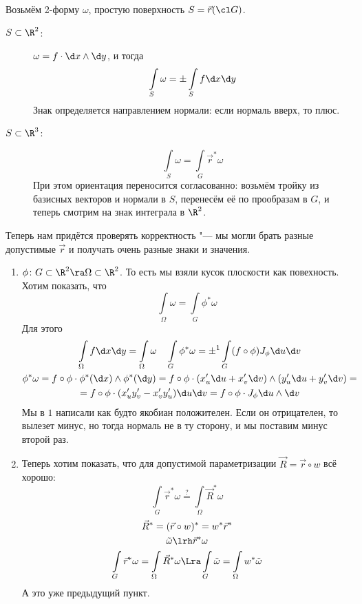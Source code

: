 \begin{Def}
	Возьмём 2-форму $\omega$, простую поверхность $S = \vec r(\cl G)$.
	\begin{description}
	\item[$S \subset \R^2$:]
		$\omega = f \cdot \d x \wedge \d y$, и тогда
		\[ \int\limits_S \omega = \pm\int\limits_S f \d x \d y \]
		Знак определяется направлением нормали: если нормаль вверх, то плюс.

	\item[$S \subset \R^3$:]
		\[ \int\limits_S \omega = \int\limits_G \vec r^* \omega \]
		При этом ориентация переносится согласованно:
		возьмём тройку из базисных векторов и нормали в $S$, перенесём её по прообразам в $G$, и теперь смотрим на знак интеграла в $\R^2$.
	\end{description}
\end{Def}

\begin{Rem}
	Теперь нам придётся проверять корректность "--- мы могли брать разные допустимые $\vec r$ и получать очень разные знаки и значения.
\end{Rem}

\begin{theorem}
	\begin{enumerate}
	\item
		$\phi\colon G \subset \R^2 \ra \Omega \subset \R^2$.
		То есть мы взяли кусок плоскости как повехность.
		Хотим показать, что
		\[ \int\limits_\Omega \omega = \int\limits_G \phi^* \omega\]
		Для этого
		\begin{gather*}
			\int\limits_\Omega f \d x \d y = \int\limits_\Omega \omega \quad
			\int\limits_G \phi^* \omega = \pm^1 \int\limits_G (f \circ \phi) J_\phi \d u \d v \\
			\phi^* \omega
			= f \circ \phi \cdot \phi^*(\d x) \wedge \phi^*(\d y)
			= f \circ \phi \cdot (x_u' \d u + x_v' \d v) \wedge (y_u' \d u + y_v' \d v) = \\
			= f \circ \phi \cdot (x_u' y_v' - x_v' y_u') \d u \d v
			= f \circ \phi \cdot J_\phi \d u \wedge \d v
		\end{gather*}
		Мы в $1$ написали как будто якобиан положителен.
		Если он отрицателен, то вылезет минус, но тогда нормаль не в ту сторону, и мы поставим минус второй раз.

	\item
		Теперь хотим показать, что для допустимой параметризации $\vec R = \vec r \circ w$ всё хорошо:
		\[ \int\limits_G \vec r^* \omega \stackrel{?}{=} \int\limits_\Omega \vec R^* \omega \]
		\begin{gather*}
			\vec R^* = (\vec r \circ w)^* = w^* \vec r^* \\
			\tilde \omega \lrh \vec r^* \omega \\
			\int\limits_G \vec r^* \omega = \int\limits_\Omega \vec R^* \omega \Lra
			\int\limits_G \tilde \omega = \int\limits_\Omega w^* \tilde \omega
		\end{gather*}
		А это уже предыдущий пункт.
	\end{enumerate}
\end{theorem}

